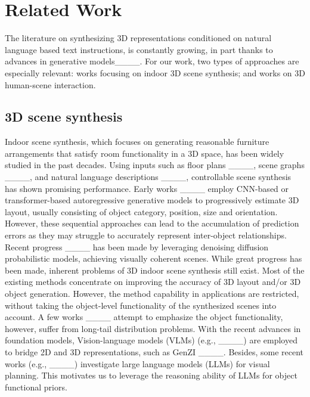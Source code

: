 \section{Related Work}
\label{sec:relat}

The literature on synthesizing 3D representations conditioned on natural language based text instructions, is constantly growing, in part thanks to advances in generative models____. For our work, two types of approaches are especially relevant: works focusing on indoor 3D scene synthesis; and works on 3D human-scene interaction. 

\subsection{3D scene synthesis} 
Indoor scene synthesis, which focuses on generating reasonable furniture arrangements that satisfy room functionality in a 3D space, has been widely studied in the past decades. Using inputs such as floor plans ____, scene graphs ____, and natural language descriptions ____, controllable scene synthesis has shown promising performance. Early works ____ employ CNN-based or transformer-based autoregressive generative models to progressively estimate 3D layout, usually consisting of object category, position, size and orientation. However, these sequential approaches can lead to the accumulation of prediction errors as they may struggle to accurately represent inter-object relationships. Recent progress ____ has been made by leveraging denoising diffusion probabilistic models, achieving visually coherent scenes. While great progress has been made, inherent problems of 3D indoor scene synthesis still exist. Most of the existing methods concentrate on improving the accuracy of 3D layout and/or 3D object generation. However, the method capability in applications are restricted, without taking the object-level functionality of the synthesized scenes into account. A few works ____ attempt to emphasize the object functionality, however, suffer from long-tail distribution problems. With the recent advances in foundation models, Vision-language models (VLMs) (e.g., ____) are employed to bridge 2D and 3D representations, such as GenZI ____. Besides, some recent works (e.g., ____) investigate large language models (LLMs) for visual planning. This motivates us to leverage the reasoning ability of LLMs for object functional priors.  

